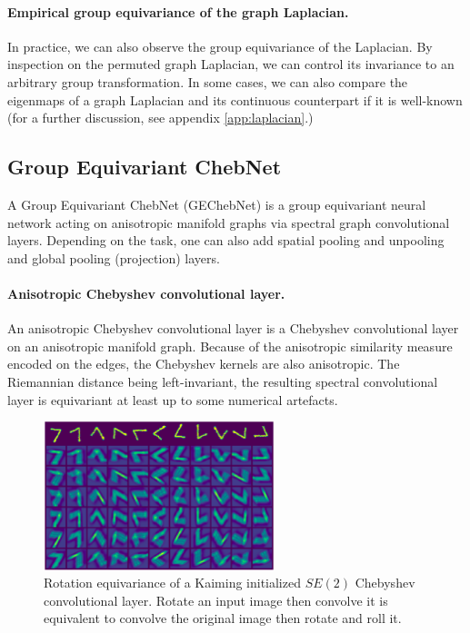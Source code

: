 \documentclass{article}
\begin{document}
\paragraph{Empirical group equivariance of the graph Laplacian.} In practice, we can also observe the group equivariance of the Laplacian. By inspection on the permuted graph Laplacian, we can control its invariance to an arbitrary group transformation. In some cases, we can also compare the eigenmaps of a graph Laplacian and its continuous counterpart if it is well-known (for a further discussion, see appendix \ref{app:laplacian}.)


\subsection{Group Equivariant ChebNet} \label{group_equivariant_chebnet}

A Group Equivariant ChebNet (GEChebNet) is a group equivariant neural network acting on anisotropic manifold graphs via spectral graph convolutional layers. Depending on the task, one can also add spatial pooling and unpooling and global pooling (projection) layers. 

\paragraph{Anisotropic Chebyshev convolutional layer.} An anisotropic Chebyshev convolutional layer is a Chebyshev convolutional layer on an anisotropic manifold graph. Because of the anisotropic similarity measure encoded on the edges, the Chebyshev kernels are also anisotropic. The Riemannian distance being left-invariant, the resulting spectral convolutional layer is equivariant at least up to some numerical artefacts. 

\begin{figure}[h!] 
    \centering
    \includegraphics[width=0.6\textwidth]{Images/chebconv_filters.png}
    \caption{Rotation equivariance of a Kaiming initialized $SE(2)$ Chebyshev convolutional layer. Rotate an input image then convolve it is equivalent to convolve the original image then rotate and roll it.}
    \label{fig:7_filters}
\end{figure}
\end{document}
